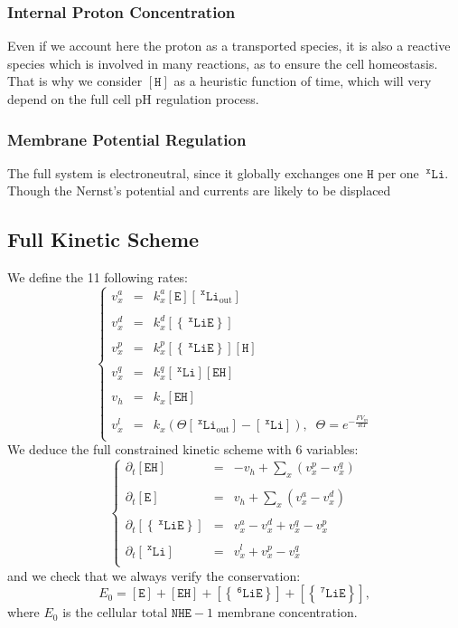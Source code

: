 \documentclass[aps,onecolumn,11pt]{revtex4}
\newcommand{\mychem}[1]{\mathtt{#1}}
\newcommand{\myconc}[1]{\left\lbrack{#1}\right\rbrack}
\newcommand{\spLi}[1]{{~^{\mychem{#1}}\mychem{Li}}}
\newcommand{\Li}[1]{\myconc{\spLi{#1}}}
\newcommand{\spEout}{\mychem{E}}
\newcommand{\Eout}{\myconc{\spEout}}
\newcommand{\spLiE}[1]{\left\lbrace\spLi{#1}\spEout\right\rbrace}
\newcommand{\LiE}[1]{\myconc{\spLiE{#1}}}
\newcommand{\spLiOut}[1]{{\spLi{#1}}_{\mathrm{out}}}
\newcommand{\LiOut}[1]{\myconc{\spLiOut{#1}}}
\newcommand{\spEHin}{\mychem{EH}}
\newcommand{\EHin}{\myconc{\spEHin}}
\newcommand{\spproton}{\mychem{H}}
\newcommand{\proton}{\myconc{\spproton}}
\newcommand{\NHE}[1]{\mychem{NHE}{\!-\!#1}}
\newcommand{\todo}[1]{\framebox{\textbf{\color{WildStrawberry}{#1}}}}
\begin{document}
\subsubsection{Internal Proton Concentration}
Even if we account here the proton as a transported species, it is also a reactive species which is involved in many reactions, as to ensure the cell homeostasis\todo{ref}. That is why we consider $\proton$ as a heuristic function of time, which will very depend on the full cell pH regulation process.

\subsubsection{Membrane Potential Regulation}
The full system is electroneutral, since it globally exchanges one $\spproton$ per one $\spLi{x}$. Though the Nernst's potential and currents are likely to be displaced \todo{more explanations?}

\subsection{Full Kinetic Scheme}
We define the 11 following rates:
\begin{equation}
	\label{eq:rates}
\left\lbrace
\begin{array}{rcl}
	v^a_x & = & k^a_x \Eout \LiOut{x} \\
	\\
	v^d_x & = & k^d_x \LiE{x} \\
	\\
	v^p_x & = & k^p_x \LiE{x} \proton\\
	\\
	v^q_x & = & k^q_x \Li{x} \EHin\\
	\\
	v_h   & = & k_x \EHin\\
	\\
	v^l_x & = & k_x\left(\Theta \LiOut{x} - \Li{x}\right),\;\;\Theta = e^{-\frac{FV_m}{RT}}\\
\end{array}
\right.
\end{equation}
We deduce the full constrained kinetic scheme with 6 variables:
\begin{equation}
	\label{eq:full}
\left\lbrace
\begin{array}{rcl}
\partial_t \EHin & = & -v_h + \sum_x\left(v^p_x - v^q_x\right)\\
\\
\partial_t \Eout & = & v_h + \sum_x(v^a_x -v^d_x)\\
\\
\partial_t \LiE{x} & = & v^a_x -v^d_x + v^q_x -v^p_x\\
\\
\partial_t \Li{x}  & = & v^l_x + v^p_x - v^q_x\\
\end{array}
\right.
\end{equation}
and we check that we always verify the conservation:
\begin{equation}
	E_0  =  \Eout + \EHin + \LiE{6} + \LiE{7},
\end{equation}
where $E_0$ is the cellular total $\NHE{1}$ membrane concentration.
\end{document}
